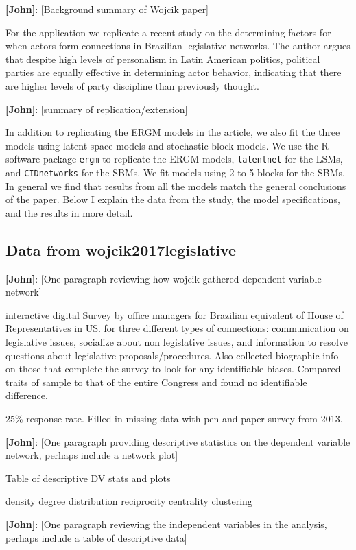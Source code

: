 \documentclass[fleqn,12pt]{wlscirep}
\begin{document}
{\bf [John]}: [Background summary of Wojcik paper] 

For the application we replicate a recent study on the determining factors for when actors form connections in Brazilian legislative networks. The author argues that despite high levels of personalism in Latin American politics, political parties are equally effective in determining actor behavior, indicating that there are higher levels of party discipline than previously thought. 


{\bf [John]}: [summary of replication/extension]

In addition to replicating the ERGM models in the article, we also fit the three models using latent space models and stochastic block models. We use the R software package \texttt{ergm} to replicate the ERGM models, \texttt{latentnet} for the LSMs, and \texttt{CIDnetworks} for the SBMs.  We fit models using 2 to 5 blocks for the SBMs. In general we find that results from all the models match the general conclusions of the paper. Below I explain the data from the study, the model specifications, and the results in more detail.

\subsection{Data from wojcik2017legislative}

{\bf [John]}: [One paragraph reviewing how wojcik gathered dependent variable network] 

interactive digital Survey by office managers for Brazilian equivalent of House of Representatives in US. for three different types of connections: communication on legislative issues, socialize about non legislative issues, and information to resolve questions about legislative proposals/procedures.
Also collected biographic info on those that complete the survey to look for any identifiable biases.  Compared traits of sample to that of the entire Congress and found no identifiable difference.

25\% response rate. Filled in missing data with pen and paper survey from 2013.

{\bf [John]}: [One paragraph providing descriptive statistics on the dependent variable network, perhaps include a network plot]

Table of descriptive DV stats and plots

density
degree distribution
reciprocity
centrality
clustering


 {\bf [John]}: [One paragraph reviewing the independent variables in the analysis, perhaps include a table of descriptive data]
\end{document}
